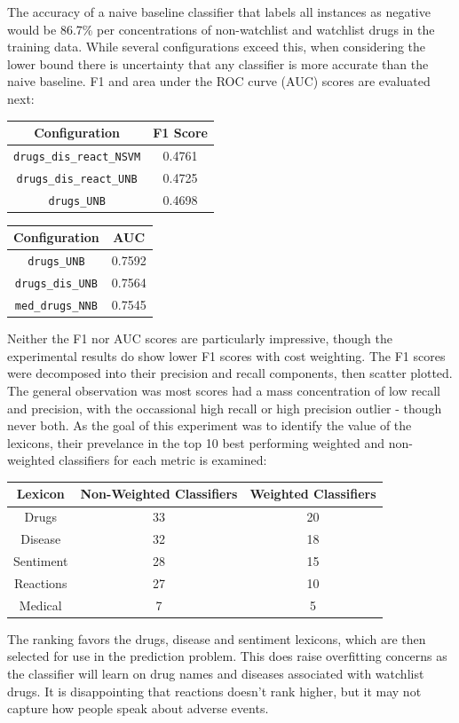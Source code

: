 \documentclass[twoside,11pt]{article}
\begin{document}
The accuracy of a naive baseline classifier that labels all instances as negative would be 86.7\% per concentrations of non-watchlist and watchlist drugs in the training data. While several configurations exceed this, when considering the lower bound there is uncertainty that any classifier is more accurate than the naive baseline. F1 and area under the ROC curve (AUC) scores are evaluated next:
\begin{center}
  \begin{tabular}{||c c||}
    \hline
    Configuration & F1 Score\\
    \hline\hline
    \verb|drugs_dis_react_NSVM| & 0.4761 \\
    \hline
    \verb|drugs_dis_react_UNB| & 0.4725 \\
    \hline
    \verb|drugs_UNB| & 0.4698 \\
    \hline
  \end{tabular}
  \quad
  \begin{tabular}{||c c||}
    \hline Configuration & AUC \\
    \hline\hline
    \verb|drugs_UNB| & 0.7592 \\
    \hline
    \verb|drugs_dis_UNB| & 0.7564 \\
    \hline
    \verb|med_drugs_NNB| & 0.7545 \\
    \hline
  \end{tabular}
\end{center}
Neither the F1 nor AUC scores are particularly impressive, though the experimental results do show lower F1 scores with cost weighting. The F1 scores were decomposed into their precision and recall components, then scatter plotted. The general observation was most scores had a mass concentration of low recall and precision, with the occassional high recall or high precision outlier - though never both.
As the goal of this experiment was to identify the value of the lexicons, their prevelance in the top 10 best performing weighted and non-weighted classifiers for each metric is examined:
\begin{center}
  \begin{tabular}{||c c c||}
    \hline
    Lexicon & Non-Weighted Classifiers & Weighted Classifiers \\
    \hline\hline
    Drugs & 33 & 20 \\
    \hline
    Disease & 32 & 18 \\
    \hline
    Sentiment & 28 & 15 \\
    \hline
    Reactions & 27 & 10 \\
    \hline
    Medical & 7 & 5 \\
    \hline
  \end{tabular}
\end{center}
The ranking favors the drugs, disease and sentiment lexicons, which are then selected for use in the prediction problem. This does raise overfitting concerns as the classifier will learn on drug names and diseases associated with watchlist drugs. It is disappointing that reactions doesn't rank higher, but it may not capture how people speak about adverse events.
\end{document}
